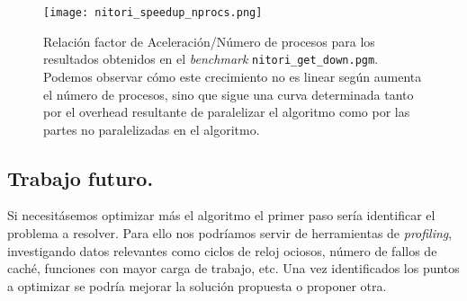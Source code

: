 \begin{figure}[H]
    \centering
    \texttt{[image: nitori\_speedup\_nprocs.png]}
    \caption{Relación factor de Aceleración/Número de procesos para los resultados obtenidos en el \textit{benchmark} \texttt{nitori\_get\_down.pgm}.
    Podemos observar cómo este crecimiento no es linear según aumenta el número de procesos, sino que sigue una curva determinada tanto por el overhead
    resultante de paralelizar el algoritmo como por las partes no paralelizadas en el algoritmo.}
\end{figure}

\subsection{Trabajo futuro.}

Si necesitásemos optimizar más el algoritmo el primer paso sería identificar el problema a resolver. Para ello nos
podríamos servir de herramientas de \textit{profiling}, investigando datos relevantes como ciclos de reloj ociosos,
número de fallos de caché, funciones con mayor carga de trabajo, etc. Una vez identificados los puntos a optimizar
se podría mejorar la solución propuesta o proponer otra.
